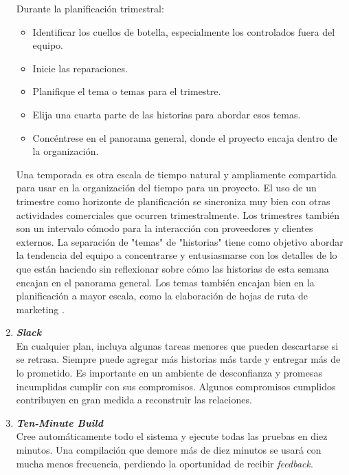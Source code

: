 \begin{spacing}{1.5}
\begin{enumerate}
				Durante la planificación trimestral:
				\begin{itemize}
					\item Identificar los cuellos de botella, especialmente los controlados fuera del equipo.
					\item Inicie las reparaciones.
					\item Planifique el tema o temas para el trimestre.
					\item Elija una cuarta parte de las historias para abordar esos temas.
					\item Concéntrese en el panorama general, donde el proyecto encaja dentro de la organización.
				\end{itemize}
			
				Una temporada es otra escala de tiempo natural y ampliamente compartida para usar en la organización del tiempo para un proyecto. El uso de un trimestre como horizonte de planificación se sincroniza muy bien con otras actividades comerciales que ocurren trimestralmente. Los trimestres también son un intervalo cómodo para la interacción con proveedores y clientes externos.
				La separación de "temas" de "historias" tiene como objetivo abordar la tendencia del equipo a concentrarse y entusiasmarse con los detalles de lo que están haciendo sin reflexionar sobre cómo las historias de esta semana encajan en el panorama general. Los temas también encajan bien en la planificación a mayor escala, como la elaboración de hojas de ruta de marketing \cite{chap2_extreme_programming}.
				\item \textit{\textbf{Slack}}\\
				En cualquier plan, incluya algunas tareas menores que pueden descartarse si se retrasa. Siempre puede agregar más historias más tarde y entregar más de lo prometido. Es importante en un ambiente de desconfianza y promesas incumplidas cumplir con sus compromisos. Algunos compromisos cumplidos contribuyen en gran medida a reconstruir las relaciones.
				\item \textit{\textbf{Ten-Minute Build}}\\
				Cree automáticamente todo el sistema y ejecute todas las pruebas en diez minutos. Una compilación que demore más de diez minutos se usará con mucha menos frecuencia, perdiendo la oportunidad de recibir \textit{feedback}.

\end{enumerate}
\end{spacing}
